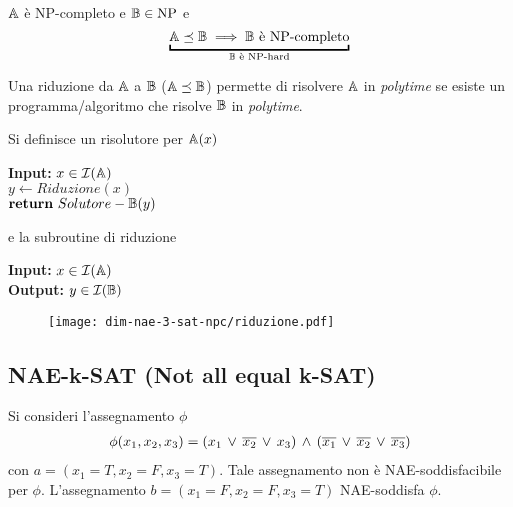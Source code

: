 \begin{definition}
	$\pbc{A}$ è NP-completo e $\mathbb{B}\in\text{NP}$ e \[\underbracket{\pbc{A}\preceq\pbc{B}\implies \pbc{B}\ \text{è NP-completo}}_{\text{$\pbc{B}$ è NP-hard}}\]
	
	Una riduzione da $\pbc{A}$ a $\mathbb{B}$ ($\mathbb{A}\preceq\mathbb{B}$) permette di risolvere $\pbc{A}$ in \textit{polytime} se esiste un programma/algoritmo che risolve $\mathbb{B}$ in \textit{polytime}.
\end{definition}
Si definisce un risolutore per $\mathbb{A}(x)$
\begin{mdframed}[frametitlerule=true, frametitle={Risolutore per $\pbc{A}$}]
	\textbf{Input: }$x\in \mathcal{I}(\mathbb{A})$\\
	$y\gets Riduzione(x)$\\
	$\textbf{return}\ Solutore-\pbc{B}(y)$
\end{mdframed}
e la subroutine di riduzione
\begin{mdframed}[frametitle={Subroutine $\mathbf{Riduzione(x)}$},frametitlerule=true]
	\textbf{Input:} $x\in \mathcal{I}(\mathbb{A})$\\
	\textbf{Output:} $y\in\mathcal{I}(\mathbb{B})$
\end{mdframed}
\begin{figure}[thbp]
	\centering
	\texttt{[image: dim-nae-3-sat-npc/riduzione.pdf]}
	\caption{}
	\label{fig:}
\end{figure}


\subsection{NAE-k-SAT (Not all equal k-SAT)}
Si consideri l'assegnamento $\phi$
\begin{gather*}
	\phi(x_1,x_2,x_3)=(x_1\,\vee\, \overline{x_2}\,\vee\, x_3)\,\wedge\,(\overline{x_1}\,\vee\,\overline{x_2}\,\vee\,\overline{x_3})
\end{gather*}
con $a=(x_1=T,x_2=F,x_3=T)$. Tale assegnamento non è NAE-soddisfacibile per $\phi$. L'assegnamento $b=(x_1=F,x_2=F,x_3=T)$ NAE-soddisfa $\phi$.
